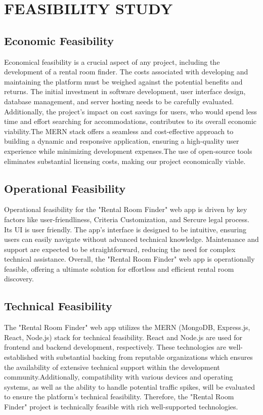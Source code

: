 \section{FEASIBILITY STUDY}
\subsection{Economic Feasibility}
Economical feasibility is a crucial aspect of any project, including the development of a rental room finder. The costs associated with developing and maintaining the platform must be weighed against the potential benefits and returns. The initial investment in software development, user interface design, database management, and server hosting needs to be carefully evaluated. Additionally, the project's impact on cost savings for users, who would spend less time and effort searching for accommodations, contributes to its overall economic viability.The MERN stack offers a seamless and cost-effective approach to building a dynamic and responsive application, ensuring a high-quality user experience while minimizing development expenses.The use of open-source tools eliminates substantial licensing costs, making our project economically viable.
\subsection{Operational Feasibility}
Operational feasibility for the "Rental Room Finder" web app is driven by key factors like user-friendliness, Criteria Customization, and Sercure legal process. Its UI is user friendly. The app's interface is designed to be intuitive, ensuring users can easily navigate without advanced technical knowledge. Maintenance and support are expected to be straightforward, reducing the need for complex technical assistance. Overall, the "Rental Room Finder" web app is operationally feasible, offering a ultimate solution for effortless and efficient rental room discovery.

\subsection{Technical Feasibility}
The "Rental Room Finder" web app utilizes the MERN (MongoDB, Express.js, React, Node.js) stack for technical feasibility. React and Node.js are used for frontend and backend development, respectively. These technologies are well-established with substantial backing from reputable organizations which ensures the availability of extensive technical support within the development community.Additionally, compatibility with various devices and operating systems, as well as the ability to handle potential traffic spikes, will be evaluated to ensure the platform's technical feasibility. Therefore, the "Rental Room Finder" project is technically feasible with rich well-supported technologies.




